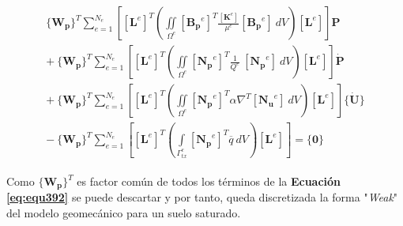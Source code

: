 \begin{ceqn} 
\begin{gather}\label{eq:equ392}
\begin{multlined}
 \{\mathbf{W_p}\}^T  \displaystyle\sum_{e=1}^{N_e} \left[ \left[\mathbf{L}^e\right]^T \left( \iint \limits_{\Omega^e}  [\mathbf{B_p}^e]^T \frac{[\mathbf{K}^e]}{\mu^e} [\mathbf{B_p}^e]\ dV \right) \left[\mathbf{L}^e\right] \right] \mathbf{P}\\[10pt]
+\ \{\mathbf{W_p}\}^T \displaystyle\sum_{e=1}^{N_e} \left[ \left[\mathbf{L}^e\right]^T \left( \iint \limits_{\Omega^e}  [\mathbf{N_p}^e]^T \frac{1}{Q^e}\ [\mathbf{N_p}^e]\ dV \right) \left[\mathbf{L}^e\right] \right] \mathbf{\dot{P}} \\[10pt]
+\ \{\mathbf{W_p}\}^T \displaystyle\sum_{e=1}^{N_e} \left[ \left[\mathbf{L}^e\right]^T \left( \iint \limits_{\Omega^e}  [\mathbf{N_p}^e]^T  \alpha \nabla^T [\mathbf{N_u}^e]\ dV \right) \left[\mathbf{L}^e\right] \right]\{\mathbf{\dot{U}}\}  \\[10pt]
-\ \{\mathbf{W_p}\}^T \displaystyle\sum_{e=1}^{N_e} \left[ \left[\mathbf{L}^e\right]^T \left(  \int \limits_{\Gamma^e_{tx}} [\mathbf{N_p}^e]^T \overline{q}\ dV \right) \left[\mathbf{L}^e\right] \right] = \{\mathbf{0}\}
\end{multlined}
\end{gather}  
\end{ceqn}

Como $\{\mathbf{W_p}\}^T$ es factor común de todos los términos de la \textbf{Ecuación} \textbf{\ref{eq:equ392}} se puede descartar y por tanto, queda discretizada la forma "\textit{Weak}" del modelo geomecánico para un suelo saturado.


